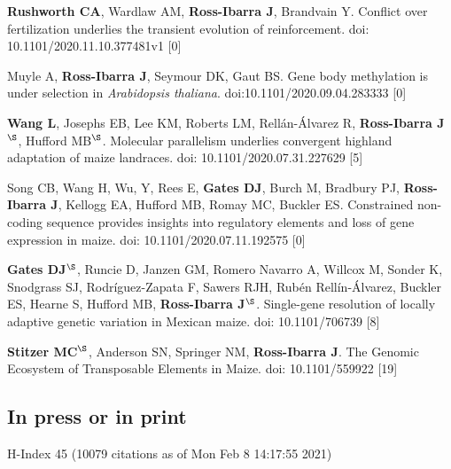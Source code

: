 \documentclass[letterpaper,10pt]{article}
\renewenvironment{itemize}{
  \begin{list}{}{
    \setlength{\leftmargin}{1.5em}
  }
}{
  \end{list}
}
\begin{document}
\begin{itemize}
\item \textbf{Rushworth CA},  Wardlaw AM, \textbf{Ross-Ibarra J}, Brandvain Y. Conflict over fertilization underlies the transient evolution of reinforcement. doi: 10.1101/2020.11.10.377481v1
 [0]\\

\item Muyle A, \textbf{Ross-Ibarra J}, Seymour DK, Gaut BS. Gene body methylation is under selection in \textit{Arabidopsis thaliana}. doi:10.1101/2020.09.04.283333
 [0]\\

\item \textbf{Wang L}, Josephs EB, Lee KM, Roberts LM, Rell\'{a}n-\'{A}lvarez R, \textbf{Ross-Ibarra J}$^\S$, Hufford MB$^\S$. Molecular parallelism underlies convergent highland adaptation of maize landraces. doi: 10.1101/2020.07.31.227629
 [5]\\

\item Song CB, Wang H, Wu, Y, Rees E, \textbf{Gates DJ}, Burch M,  Bradbury PJ, \textbf{Ross-Ibarra J}, Kellogg EA, Hufford MB, Romay MC, Buckler ES.  Constrained non-coding sequence provides insights into regulatory elements and loss of gene expression in maize. doi: 10.1101/2020.07.11.192575
 [0]\\

\item \textbf{Gates DJ}$^\S$, Runcie D, Janzen GM, Romero Navarro A,  Willcox M,  Sonder K, Snodgrass SJ, Rodr\'{i}guez-Zapata F,  Sawers RJH, Rub\'{e}n Rell\'{i}n-\'{A}lvarez, Buckler ES, Hearne S, Hufford MB, \textbf{Ross-Ibarra J}$^\S$. Single-gene resolution of locally adaptive genetic variation in Mexican maize. doi: 10.1101/706739
 [8]\\

\item \textbf{Stitzer MC}$^\S$, Anderson SN, Springer NM, \textbf{Ross-Ibarra J}. The Genomic Ecosystem of Transposable Elements in Maize. doi: 10.1101/559922
 [19]\\

\end{itemize}

\subsection*{In press or in print} %
 {\small H-Index 45 (10079 citations as of Mon Feb  8 14:17:55 2021)}
\end{document}
